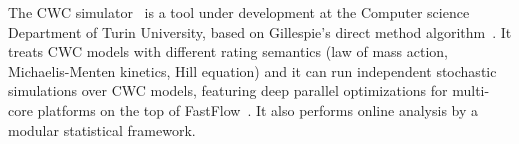 The CWC simulator~\cite{HCWC_SIM} is a tool under development at the Computer science Department of Turin University, based on Gillespie's direct method
algorithm~\cite{G77}. It treats CWC models with different rating semantics (law of mass action, Michaelis-Menten kinetics, Hill equation) and
it can run independent stochastic simulations over CWC models, featuring deep parallel optimizations for multi-core platforms on the top of
FastFlow~\cite{fastflow:web}. It also performs online analysis by a modular statistical framework.





